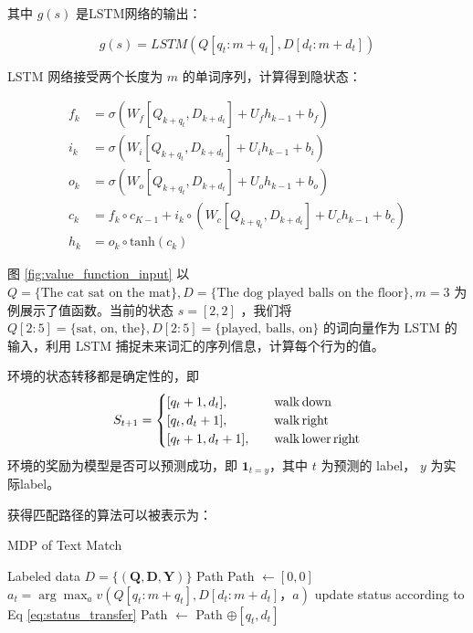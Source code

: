 其中 $g(s)$ 是LSTM网络的输出：

$$
g(s) = LSTM(Q[q_{t}:m+q_{t}], D [d_{t}:m+d_{t}])
$$

LSTM 网络接受两个长度为 $m$ 的单词序列，计算得到隐状态：

\begin{equation}
\label{eq:LSTM}
\begin{aligned}
f_k &= \sigma(W_f[Q_{k+q_{t}}, D_{k+d_{t}}] + U_fh_{k-1} + b_f) \\
i_k &= \sigma(W_i[Q_{k+q_{t}}, D_{k+d_{t}}] + U_ih_{k-1} + b_i) \\
o_k &= \sigma(W_o[Q_{k+q_{t}}, D_{k+d_{t}}] + U_oh_{k-1} + b_o) \\
c_k &= f_k \circ c_{K-1} + i_k \circ (W_c[Q_{k+q_{t}}, D_{k+d_{t}}] + U_ch_{k-1}+b_c) \\
h_k &= o_k \circ \text{tanh}(c_k)
\end{aligned}
\end{equation}

图 \ref{fig:value_function_input} 以 $Q=\{\text{The cat sat on the mat}\},D=\{\text{The dog played balls on the floor}\}, m=3$ 为例展示了值函数。当前的状态 $s=[2, 2]$ ，我们将 $Q[2:5]=\{\text{sat, on, the}\}, D[2:5]=\{\text{played, balls, on}\}$ 的词向量作为 LSTM 的输入，利用 LSTM 捕捉未来词汇的序列信息，计算每个行为的值。

环境的状态转移都是确定性的，即
\begin{equation}
\label{eq:status_transfer}
S_{t+1} =
\begin{cases}
[q_{t} + 1, d_{t}], & \quad{\rm walk\,down} \\
[q_{t}, d_{t} + 1], & \quad{\rm walk\,right} \\
[q_{t} + 1, d_{t}+1], & \quad{\rm walk\,lower\,right}
\end{cases}
\end{equation}
环境的奖励为模型是否可以预测成功，即 $\mathbf{1}_{t=y}$，其中 $t$ 为预测的 label， $y$ 为实际label。

获得匹配路径的算法可以被表示为：
\begin{algorithm}[!htbp]
    \small
    \caption{MDP of Text Match}\label{alg:MDP_TM}
    \renewcommand{\algorithmicrequire}{\textbf{Input:}}
    \renewcommand{\algorithmicensure}{\textbf{Output:}}
    \begin{algorithmic}
        \Require Labeled data $D=\{ (\mathbf{Q}, \mathbf{D}, \mathbf{Y}) \}$
        \Ensure Path
        \State {} Path $\leftarrow [0, 0]$
        \State $a_t = \arg\max_a v(Q [q_t:m+q_t], D [d_t:m+d_t]， a)$
        \State update status according to Eq \ref{eq:status_transfer}
        \State Path $\leftarrow$ Path $\oplus [q_t, d_t]$ 
        \EndWhile
    \end{algorithmic}
\end{algorithm}

